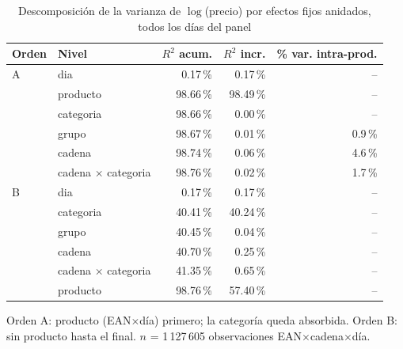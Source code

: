 \begin{table}[htbp]
\caption{Descomposici\'on de la varianza de $\log$(precio) por efectos fijos anidados, todos los d\'ias del panel}
\label{tab:varianza}
\centering\scriptsize\setlength{\tabcolsep}{3pt}
\begin{tabular}{@{}llrrr@{}}
\toprule
Orden & Nivel & $R^2$ acum. & $R^2$ incr. & \% var. intra-prod. \\
\midrule
A & dia & 0.17\,\% & 0.17\,\% & -- \\
 & producto & 98.66\,\% & 98.49\,\% & -- \\
 & categoria & 98.66\,\% & 0.00\,\% & -- \\
 & grupo & 98.67\,\% & 0.01\,\% & 0.9\,\% \\
 & cadena & 98.74\,\% & 0.06\,\% & 4.6\,\% \\
 & cadena $\times$ categoria & 98.76\,\% & 0.02\,\% & 1.7\,\% \\
\midrule
B & dia & 0.17\,\% & 0.17\,\% & -- \\
 & categoria & 40.41\,\% & 40.24\,\% & -- \\
 & grupo & 40.45\,\% & 0.04\,\% & -- \\
 & cadena & 40.70\,\% & 0.25\,\% & -- \\
 & cadena $\times$ categoria & 41.35\,\% & 0.65\,\% & -- \\
 & producto & 98.76\,\% & 57.40\,\% & -- \\
\bottomrule\end{tabular}
\par\smallskip\raggedright\scriptsize Orden A: producto (EAN$\times$d\'ia) primero; la categor\'ia queda absorbida. Orden B: sin producto hasta el final. $n$ = 1\,127\,605 observaciones EAN$\times$cadena$\times$d\'ia.
\end{table}
